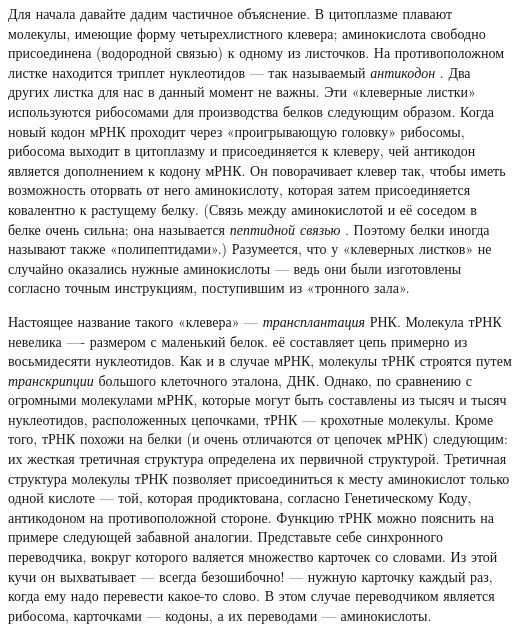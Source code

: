 \documentclass[../main.tex]{subfiles}
\begin{document}
Для начала давайте дадим частичное объяснение. В цитоплазме плавают молекулы, имеющие форму четырехлистного клевера; аминокислота свободно присоединена (водородной связью) к одному из листочков. На противоположном листке находится триплет нуклеотидов --- так называемый \emph{антикодон} . Два других листка для нас в данный момент не важны. Эти «клеверные листки» используются рибосомами для производства белков следующим образом. Когда новый кодон мРНК проходит через «проигрывающую головку» рибосомы, рибосома выходит в цитоплазму и присоединяется к клеверу, чей антикодон является дополнением к кодону мРНК\@. Он поворачивает клевер так, чтобы иметь возможность оторвать от него аминокислоту, которая затем присоединяется ковалентно к растущему белку. (Связь между аминокислотой и её соседом в белке очень сильна; она называется \emph{пептидной связью} . Поэтому белки иногда называют также «полипептидами».) Разумеется, что у «клеверных листков» не случайно оказались нужные аминокислоты --- ведь они были изготовлены согласно точным инструкциям, поступившим из «тронного зала».

Настоящее название такого «клевера» --- \emph{трансплантация} РНК\@. Молекула тРНК невелика ---- размером с маленький белок. её составляет цепь примерно из восьмидесяти нуклеотидов. Как и в случае мРНК, молекулы тРНК строятся путем \emph{транскрипции} большого клеточного эталона, ДНК\@. Однако, по сравнению с огромными молекулами мРНК, которые могут быть составлены из тысяч и тысяч нуклеотидов, расположенных цепочками, тРНК --- крохотные молекулы. Кроме того, тРНК похожи на белки (и очень отличаются от цепочек мРНК) следующим: их жесткая третичная структура определена их первичной структурой. Третичная структура молекулы тРНК позволяет присоединиться к месту аминокислот только одной кислоте --- той, которая продиктована, согласно Генетическому Коду, антикодоном на противоположной стороне. Функцию тРНК можно пояснить на примере следующей забавной аналогии. Представьте себе синхронного переводчика, вокруг которого валяется множество карточек со словами. Из этой кучи он выхватывает --- всегда безошибочно! --- нужную карточку каждый раз, когда ему надо перевести какое-то слово. В этом случае переводчиком является рибосома, карточками --- кодоны, а их переводами --- аминокислоты.
\end{document}
